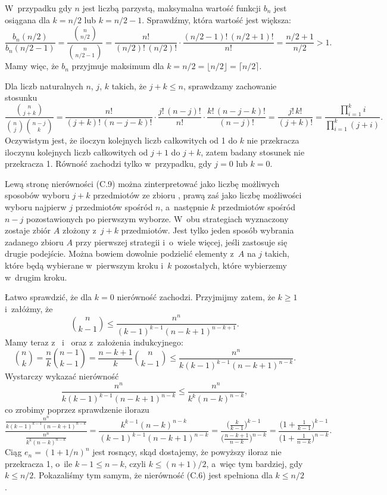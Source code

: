 W~przypadku gdy $n$ jest liczbą parzystą, maksymalna wartość funkcji $b_n$ jest osiągana dla $k=n/2$ lub $k=n/2-1$.
Sprawdźmy, która wartość jest większa:
\[
    \frac{b_n(n/2)}{b_n(n/2-1)} = \frac{\binom{n}{n/2}}{\binom{n}{n/2-1}} = \frac{n!}{(n/2)!\,(n/2)!}\cdot\frac{(n/2-1)!\,(n/2+1)!}{n!} = \frac{n/2+1}{n/2} > 1.
\]
Mamy więc, że $b_n$ przyjmuje maksimum dla $k=n/2=\lfloor n/2\rfloor=\lceil n/2\rceil$.

\exercise %
Dla liczb naturalnych $n$, $j$, $k$ takich, że $j+k\le n$, sprawdzamy zachowanie stosunku
\[
	\frac{\binom{n}{j+k}}{\binom{n}{j}\binom{n-j}{k}} = \frac{n!}{(j+k)!\,(n-j-k)!}\cdot\frac{j!\,(n-j)!}{n!}\cdot\frac{k!\,(n-j-k)!}{(n-j)!} = \frac{j!\,k!}{(j+k)!} = \frac{\prod_{i=1}^ki}{\prod_{i=1}^k(j+i)}.
\]
Oczywistym jest, że iloczyn kolejnych liczb całkowitych od 1 do $k$ nie przekracza iloczynu kolejnych liczb całkowitych od $j+1$ do $j+k$, zatem badany stosunek nie przekracza 1.
Równość zachodzi tylko w~przypadku, gdy $j=0$ lub $k=0$.

Lewą stronę nierówności (C.9) można zinterpretować jako liczbę możliwych sposobów wyboru $j+k$ przedmiotów ze zbioru , prawą zaś jako liczbę możliwości wyboru najpierw $j$ przedmiotów spośród $n$, a~następnie $k$ przedmiotów spośród $n-j$ pozostawionych po pierwszym wyborze.
W~obu strategiach wyznaczony zostaje zbiór $A$ złożony z~$j+k$ przedmiotów.
Jest tylko jeden sposób wybrania zadanego zbioru $A$ przy pierwszej strategii i~o~wiele więcej, jeśli zastosuje się drugie podejście.
Można bowiem dowolnie podzielić elementy z~$A$ na $j$ takich, które będą wybierane w~pierwszym kroku i~$k$ pozostałych, które wybierzemy w~drugim kroku.

\exercise %
Łatwo sprawdzić, że dla $k=0$ nierówność zachodzi.
Przyjmijmy zatem, że $k\ge1$ i~załóżmy, że
\[
	\binom{n}{k-1} \le \frac{n^n}{(k-1)^{k-1}(n-k+1)^{n-k+1}}.
\]
Mamy teraz z~ i~ oraz z~założenia indukcyjnego:
\[
	\binom{n}{k} = \frac{n}{k}\binom{n-1}{k-1} = \frac{n-k+1}{k}\binom{n}{k-1} \le \frac{n^n}{k(k-1)^{k-1}(n-k+1)^{n-k}}.
\]
Wystarczy wykazać nierówność
\[
	\frac{n^n}{k(k-1)^{k-1}(n-k+1)^{n-k}} \le \frac{n^n}{k^k(n-k)^{n-k}},
\]
co zrobimy poprzez sprawdzenie ilorazu
\[
	\frac{\frac{n^n}{k(k-1)^{k-1}(n-k+1)^{n-k}}}{\frac{n^n}{k^k(n-k)^{n-k}}} = \frac{k^{k-1}(n-k)^{n-k}}{(k-1)^{k-1}(n-k+1)^{n-k}} = \frac{\bigl(\frac{k}{k-1}\bigr)^{k-1}}{\bigl(\frac{n-k+1}{n-k}\bigr)^{n-k}} = \frac{\bigl(1+\frac{1}{k-1}\bigr)^{k-1}}{\bigl(1+\frac{1}{n-k}\bigr)^{n-k}}.
\]
Ciąg $e_n={(1+1/n)}^n$ jest rosnący, skąd dostajemy, że powyższy iloraz nie przekracza 1, o~ile $k-1\le n-k$, czyli $k\le(n+1)/2$, a~więc tym bardziej, gdy $k\le n/2$.
Pokazaliśmy tym samym, że nierówność (C.6) jest spełniona dla $k\le n/2$.

